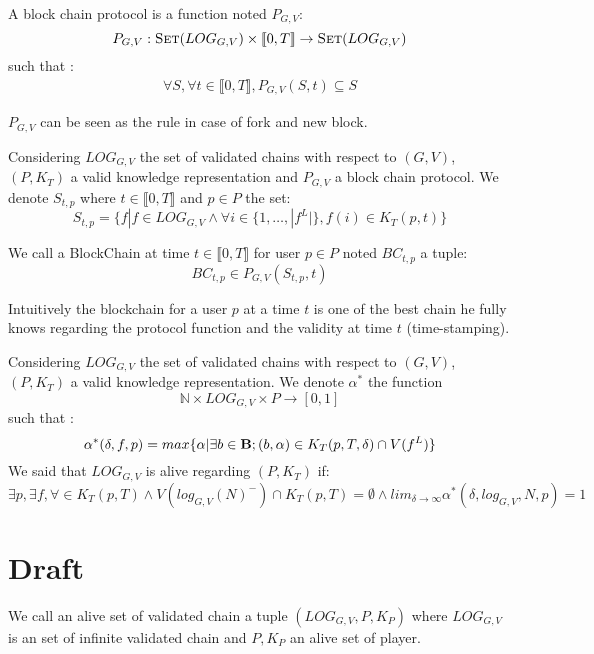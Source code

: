 \begin{mydef}
	A block chain protocol is a function noted $P_{G,V}$:
	$$P_{G,V} : \text{\sc Set}(LOG_{G,V}) \times \llbracket0,T\rrbracket \rightarrow \text{\sc Set}(LOG_{G,V}) $$
	such that :
\begin{eqnarray*}		
	\forall S, \forall t \in \llbracket0,T\rrbracket, P_{G,V}(S,t) \subseteq S
\end{eqnarray*}
\end{mydef}
\begin{myrem}
	$P_{G,V}$ can be seen as the rule in case of fork and new block. 
\end{myrem}

\begin{mydef}
	Considering $LOG_{G,V}$ the set of validated chains with respect to $(G,V)$, $(P,K_T)$ a valid knowledge representation and $P_{G,V}$ a block chain protocol. We denote $S_{t,p}$ where $t\in \llbracket0,T\rrbracket$ and $p\in P$ the set:
	$$ S_{t,p} = \{f | f \in LOG_{G,V} \land \forall i \in \{1, \ldots, |f^L|\}, f(i) \in K_T(p,t)\} $$
	
	We call a BlockChain at time $t\in \llbracket0,T\rrbracket$ for user $p \in P$ noted $BC_{t,p}$ a tuple:
	$$BC_{t,p} \in P_{G,V}(S_{t,p},t) $$
	
\end{mydef}
\begin{myrem}
	Intuitively the blockchain for a user $p$ at a time $t$ is one of the best chain he fully knows regarding the protocol function and the validity at time $t$ (time-stamping).
\end{myrem}

\begin{mydef}
	Considering $LOG_{G,V}$ the set of validated chains with respect to $(G,V)$, $(P,K_T)$ a valid knowledge representation.
	We denote $\alpha^*$ the function $$ \mathbb{N} \times LOG_{G,V} \times P \rightarrow [0,1]$$ such that : 
	$$\alpha^*(\delta,f,p) = max\{\alpha | \exists b \in \text{\bf B}; (b,\alpha) \in K_T(p,T,\delta)\cap V(f^L)\} $$
	We said that $LOG_{G,V}$ is alive regarding $(P,K_T)$ if:
	$$\exists p, \exists f, \forall  \in K_T(p,T) \land V(log_{G,V}(N)^-) \cap K_T(p,T) = \emptyset \land lim_{\delta\rightarrow \infty} \alpha^*(\delta,log_{G,V},N,p) = 1$$
\end{mydef}


\section{Draft}

\begin{mydef}
	We call an alive set of validated chain a tuple $(LOG_{G,V},P,K_P)$ where $LOG_{G,V}$ is an set of infinite validated chain and $P,K_P$ an alive set of player.
\end{mydef}

